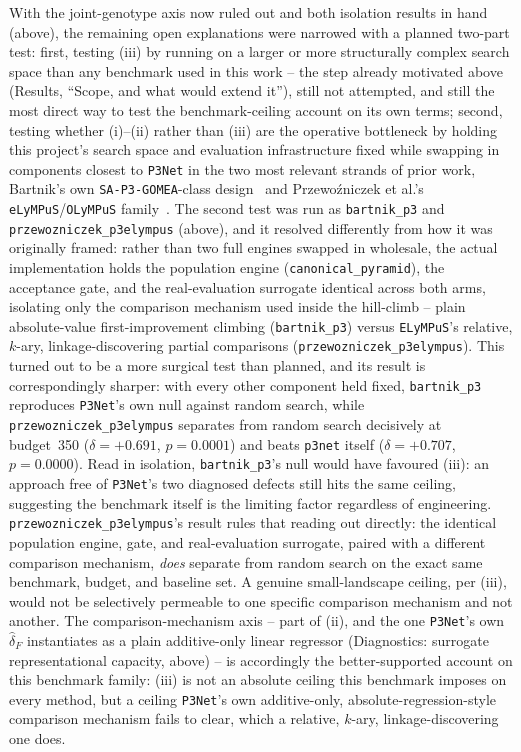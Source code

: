     With the joint-genotype axis now ruled out and both isolation results in hand (above), the
    remaining open explanations were narrowed with a planned two-part test: first, testing (iii) by running on a
    larger or more structurally complex search space than any benchmark used in this work -- the step already
    motivated above (Results, ``Scope, and what would extend it''), still not attempted, and still the most
    direct way to test the benchmark-ceiling account on its own terms; second, testing whether (i)--(ii) rather
    than (iii) are the operative bottleneck by holding this project's search space and evaluation infrastructure
    fixed while swapping in components closest to \texttt{P3Net} in the two most relevant strands of prior work,
    Bartnik's own \texttt{SA-P3-GOMEA}-class design~\citep{bartnik2026evolutionary,dushatskiy2021novelsurrogateassistedevolutionaryalgorithm}
    and Przewoźniczek et al.'s \texttt{eLyMPuS}/\texttt{OLyMPuS} family~\citep{przewozniczek2026lympus}. The second
    test was run as \texttt{bartnik\_p3} and \texttt{przewozniczek\_p3elympus} (above), and it resolved
    differently from how it was originally framed: rather than two full engines swapped in wholesale, the actual
    implementation holds the population engine (\texttt{canonical\_pyramid}), the acceptance gate, and the
    real-evaluation surrogate identical across both arms, isolating only the comparison mechanism used inside
    the hill-climb -- plain absolute-value first-improvement climbing (\texttt{bartnik\_p3}) versus
    \texttt{ELyMPuS}'s relative, $k$-ary, linkage-discovering partial comparisons
    (\texttt{przewozniczek\_p3elympus}). This turned out to be a more surgical test than planned, and its result
    is correspondingly sharper: with every other component held fixed, \texttt{bartnik\_p3} reproduces
    \texttt{P3Net}'s own null against random search, while \texttt{przewozniczek\_p3elympus} separates from
    random search decisively at budget~350 ($\delta=+0.691$, $p=0.0001$) and beats \texttt{p3net} itself
    ($\delta=+0.707$, $p=0.0000$). Read in isolation, \texttt{bartnik\_p3}'s null would have favoured (iii): an
    approach free of \texttt{P3Net}'s two diagnosed defects still hits the same ceiling, suggesting the benchmark
    itself is the limiting factor regardless of engineering. \texttt{przewozniczek\_p3elympus}'s result rules
    that reading out directly: the identical population engine, gate, and real-evaluation surrogate, paired with
    a different comparison mechanism, \emph{does} separate from random search on the exact same benchmark,
    budget, and baseline set. A genuine small-landscape ceiling, per (iii), would not be selectively permeable
    to one specific comparison mechanism and not another. The comparison-mechanism axis -- part of (ii), and the
    one \texttt{P3Net}'s own $\hat\delta_F$ instantiates as a plain additive-only linear regressor (Diagnostics:
    surrogate representational capacity, above) -- is accordingly the better-supported account on this benchmark
    family: (iii) is not an absolute ceiling this benchmark imposes on every method, but a ceiling
    \texttt{P3Net}'s own additive-only, absolute-regression-style comparison mechanism fails to clear, which a
    relative, $k$-ary, linkage-discovering one does.

